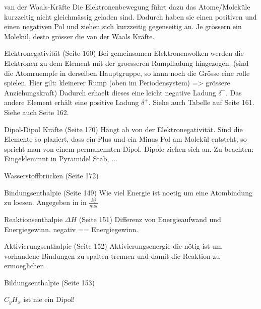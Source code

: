 \documentclass[11pt,paper=a4,final]{scrartcl}
\begin{document}
\begin{description*}
  \item[van der Waals-Kr\"afte] Die Elektronenbewegung f\"uhrt dazu das
  Atome/Molek\"ule kurzzeitig nicht gleichm\"assig geladen sind. Dadurch haben
  sie einen positiven und einen negativen Pol und ziehen sich kurzzeitig
  gegenseitig an. Je gr\"ossern ein Molek\"ul, desto gr\"osser die van der Waals
  Kr\"afte. 
  \item[Elektronegativit\"at] (Seite 160) Bei gemeinsamen Elektronenwolken
  werden die Elektronen zu dem Element mit der groesseren Rumpfladung
  hingezogen. (sind die Atomruempfe in derselben Hauptgruppe, so kann noch die
  Gr\"osse eine rolle spielen. Hier gilt: kleinerer Rump (oben im
  Periodensystem) => gr\"ossere Anziehungskraft) Dadurch erhaelt dieses eine
  leicht negative Ladung \(\delta^-\). Das andere Element erh\"alt eine positive
  Ladung \(\delta^+\). Siehe auch Tabelle auf Seite 161. Siehe auch Seite 162.
  \item[Dipol-Dipol Kr\"afte] (Seite 170) H\"angt ab von der
  Elektronegativit\"at. Sind die Elemente so plaziert, dass ein Plus und ein
  Minus Pol am Molek\"ul entsteht, so spricht man von einem permanennten Dipol.
  Dipole ziehen sich an. Zu beachten: Eingeklemmnt in Pyramide! Stab, ... 
  \item[Wasserstoffbr\"ucken] (Seite 172)
  \item[Bindungsenthalpie] (Seite 149) Wie viel Energie ist noetig um eine
  Atombindung zu loesen. Angegeben in in \(\frac{kj}{mol}\)
  \item[Reaktionsenthalpie \(\Delta H\)] (Seite 151) Differenz von
  Energieaufwand und Energiegewinn. negativ == Energiegewinn.
  \item[Aktivierungsenthalpie] (Seite 152) Aktivierungsenergie die n\"otig ist
  um vorhandene Bindungen zu spalten trennen und damit die Reaktion zu
  ermoeglichen.
  \item[Bildungsenthalpie] (Seite 153)
\end{description*}
\(C_yH_x\) ist nie ein Dipol!
\end{document}
